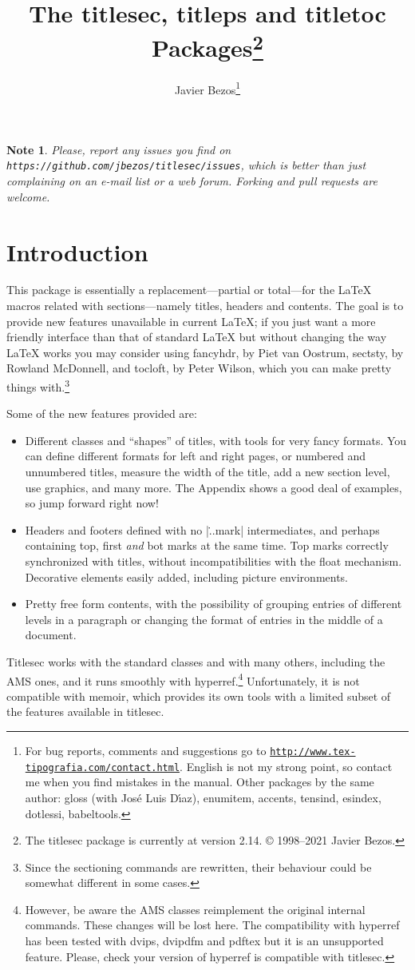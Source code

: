 \documentclass[a4paper]{ltxguide}
\title{The \textsf{titlesec}, \textsf{titleps} and \textsf{titletoc} 
Packages\footnote{The \textsf{titlesec} package is currently at 
version 2.14. \copyright{} 1998--2021 Javier Bezos.}}
\author{Javier Bezos\footnote{For bug reports, comments and
suggestions go to \href{http://www.tex-tipografia.com/contact.html}%
{\texttt{http://www.tex-tipografia.com/contact.html}}.  English
is not my strong point, so contact me when you find mistakes in the
manual.  Other packages by the same author: \textsf{gloss} (with
Jos\'e Luis D\'{\i}az), \textsf{enumitem, accents, tensind, esindex,
dotlessi, babeltools}.}}
\date{\docdate}
\newtheorem{note}{Note}
\begin{document}
\maketitle
\tableofcontents

\begin{note}
  Please, report any issues you find on
  \texttt{https://github.com/jbezos/titlesec/issues}, which is better
  than just complaining on an e-mail list or a web forum. Forking
  and pull requests are welcome.
\end{note}

\section{Introduction}

This package is essentially a replacement---partial or total---for the 
\LaTeX{} macros related with sections---namely titles, headers and 
contents.  The goal is to provide new features unavailable in current 
\LaTeX{}; if you just want a more friendly interface than that of 
standard \LaTeX{} but without changing the way \LaTeX{} works you may 
consider using \textsf{fancyhdr}, by Piet van Oostrum, \textsf{sectsty},
by Rowland McDonnell, and \textsf{tocloft}, by Peter Wilson, which you
can make pretty things with.\footnote{Since the sectioning commands 
are rewritten, their behaviour could be somewhat different 
in some cases.}

Some of the new features provided are:
\begin{itemize}
\item Different classes and ``shapes'' of titles, with tools for very 
fancy formats.  You can define different formats for left and right 
pages, or numbered and unnumbered titles, measure the width of the 
title, add a new section level, use graphics, and many more.  The 
Appendix shows a good deal of examples, so jump forward right now!

\item Headers and footers defined with no |\...mark| intermediates,
and perhaps containing top, first \emph{and} bot marks at the same time.
Top marks correctly synchronized with titles, without 
incompatibilities with the float mechanism. Decorative elements easily
added, including picture environments.

\item Pretty free form contents, with the possibility of grouping 
entries of different levels in a paragraph or changing the format
of entries in the middle of a document.
\end{itemize}
\textsf{Titlesec} works with the standard classes and with many
others, including the AMS ones, and it runs smoothly with
\textsf{hyperref}.\footnote{However, be aware the AMS classes
reimplement the original internal commands.  These changes will be
lost here.  The compatibility with \textsf{hyperref} has been tested
with \textsf{dvips}, \textsf{dvipdfm} and \textsf{pdftex} but it is an
unsupported feature.  Please, check your version of
\textsf{hyperref} is compatible with \textsf{titlesec}.}
Unfortunately, it is not compatible with \textsf{memoir}, which
provides its own tools with a limited subset of the features available
in \textsf{titlesec}.
\end{document}
